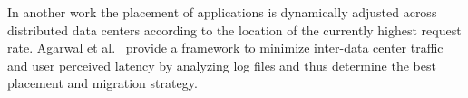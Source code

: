 In another work \cite{malet2010resource} the placement of applications is dynamically adjusted across distributed data centers according to the location of the currently highest request rate. Agarwal et al.~\cite{agarwal2010volley} provide a framework to minimize inter-data center traffic and user perceived latency by analyzing log files and thus determine the best placement and migration strategy. 



%
%

%
%
%
%








